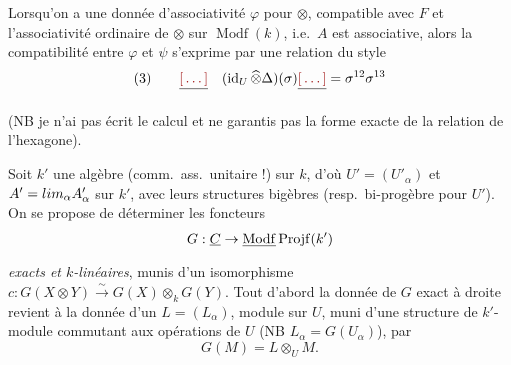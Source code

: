 \documentclass[11pt,a4paper]{article}
\begin{document}
Lorsqu'on a une donnée d'associativité $\varphi$ pour $\otimes$, compatible avec
$F$ et l'associativité ordinaire de $\otimes$ sur $\operatorname{Modf}(k)$,
i.e.\ $A$ est associative, alors la compatibilité entre $\varphi$ et $\psi$
s'exprime par une relation du style
\[ (3) \qquad \struck{\ill{}} \quad
 (\operatorname{id}_{U} \mathbin{\widehat{\otimes}} \Delta)(\sigma)
 \struck{\ill{}} = \sigma^{12}\sigma^{13} \]


 (NB je
n'ai pas écrit le calcul et ne garantis pas la forme exacte de la relation de
l'hexagone).

Soit $k'$ une algèbre (comm.\ ass.\ unitaire !) sur $k$, d'où
$U' = (U'_{\alpha})$ et $A' = \varinjlim_{\alpha} A'_{\alpha}$ sur $k'$, avec
leurs structures  bigèbres (resp.\ bi-progèbre pour $U'$). On
se propose de déterminer les foncteurs
\[ G : \underline{C} \to \struck{\operatorname{Modf}}
   \operatorname{Projf}(k') \]
 \emph{exacts et $k$-linéaires}, munis
d'un isomorphisme $c : G(X \otimes Y) \xrightarrow{\sim} G(X) \otimes_{k} G(Y)$.
\struck{\ill{}} Tout d'abord la donnée de $G$ exact à droite
 revient à la donnée d'un
$L = (L_{\alpha})$, module  sur $U$, muni d'une structure de
$k'$-module \struck{\ill{}} commutant aux opérations de $U$ (NB
$L_{\alpha} = G(U_{\alpha})$), par
\[ G(M) = L \otimes_{U} M . \]
\end{document}
